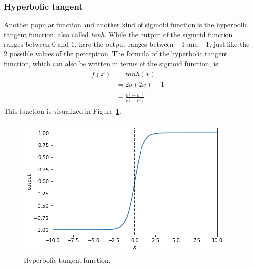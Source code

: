 \subsubsection{Hyperbolic tangent} %
\label{ssub:hyperbolic_tangent}
Another popular function and another kind of sigmoid function is the hyperbolic tangent function, also called \textit{tanh}. While the output of the sigmoid function ranges between $0$ and $1$, here the output ranges between $-1$ and $+1$, just like the 2 possible values of the perceptron.
The formula of the hyperbolic tangent function, which can also be written in terms of the sigmoid function, is:
\begin{align}
    \begin{split}
        f(x) &= tanh(x)\\
        &= 2\sigma(2x) - 1\\
        &= \frac{e^{\frac{x}{2}} - e^{-\frac{x}{2}}}{e^{\frac{x}{2}} + e^{-\frac{x}{2}}}
    \end{split}
\end{align}
This function is visualized in Figure~\ref{fig:tanh}.
\begin{figure}[htb]
    \centering
    \includegraphics[width=.8\linewidth]{images/activation_functions/tanh.png}
    \caption{Hyperbolic tangent function.}
    \label{fig:tanh}
\end{figure}

